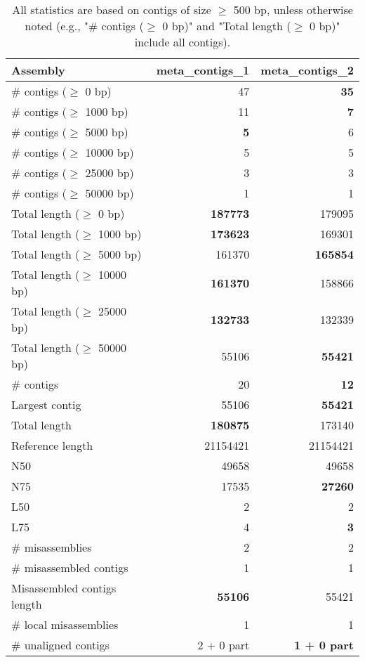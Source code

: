 \documentclass[12pt,a4paper]{article}
\begin{document}
\begin{table}[ht]
\begin{center}
\caption{All statistics are based on contigs of size $\geq$ 500 bp, unless otherwise noted (e.g., "\# contigs ($\geq$ 0 bp)" and "Total length ($\geq$ 0 bp)" include all contigs).}
\begin{tabular}{|l*{2}{|r}|}
\hline
Assembly & meta\_contigs\_1 & meta\_contigs\_2 \\ \hline
\# contigs ($\geq$ 0 bp) & 47 & {\bf 35} \\ \hline
\# contigs ($\geq$ 1000 bp) & 11 & {\bf 7} \\ \hline
\# contigs ($\geq$ 5000 bp) & {\bf 5} & 6 \\ \hline
\# contigs ($\geq$ 10000 bp) & 5 & 5 \\ \hline
\# contigs ($\geq$ 25000 bp) & 3 & 3 \\ \hline
\# contigs ($\geq$ 50000 bp) & 1 & 1 \\ \hline
Total length ($\geq$ 0 bp) & {\bf 187773} & 179095 \\ \hline
Total length ($\geq$ 1000 bp) & {\bf 173623} & 169301 \\ \hline
Total length ($\geq$ 5000 bp) & 161370 & {\bf 165854} \\ \hline
Total length ($\geq$ 10000 bp) & {\bf 161370} & 158866 \\ \hline
Total length ($\geq$ 25000 bp) & {\bf 132733} & 132339 \\ \hline
Total length ($\geq$ 50000 bp) & 55106 & {\bf 55421} \\ \hline
\# contigs & 20 & {\bf 12} \\ \hline
Largest contig & 55106 & {\bf 55421} \\ \hline
Total length & {\bf 180875} & 173140 \\ \hline
Reference length & 21154421 & 21154421 \\ \hline
N50 & 49658 & 49658 \\ \hline
N75 & 17535 & {\bf 27260} \\ \hline
L50 & 2 & 2 \\ \hline
L75 & 4 & {\bf 3} \\ \hline
\# misassemblies & 2 & 2 \\ \hline
\# misassembled contigs & 1 & 1 \\ \hline
Misassembled contigs length & {\bf 55106} & 55421 \\ \hline
\# local misassemblies & 1 & 1 \\ \hline
\# unaligned contigs & 2 + 0 part & {\bf 1 + 0 part} \\ \hline

\end{tabular}
\end{center}
\end{table}
\end{document}
